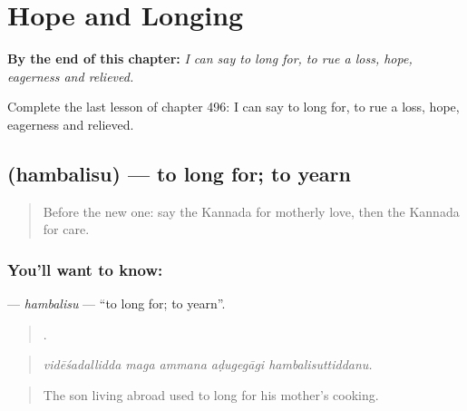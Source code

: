 
\chapter{Hope and Longing}
\label{ch:ka-hope-and-longing}

\begin{chapteropening}
\textbf{By the end of this chapter:} \emph{I can say to long for, to rue a loss, hope, eagerness and relieved.}

Complete the last lesson of chapter 496: I can say to long for, to rue a loss, hope, eagerness and relieved.
\end{chapteropening}

\section[\texorpdfstring{\kn{ಹಂಬಲಿಸು} (hambalisu)}{ಹಂಬಲಿಸು (hambalisu)}]{ (hambalisu) — to long for; to yearn}

\label{lesson:KA-C496-hambalisu}



\begin{quote}
Before the new one: say the Kannada for motherly love, then the Kannada for care.
\end{quote}

\subsection*{You'll want to know: }
\textbf{} — \emph{hambalisu} — \textquotedblleft{}to long for; to yearn\textquotedblright{}.

\begin{quote}
    .
\end{quote}

\begin{quote}
\emph{vidēśadallidda maga ammana aḍugegāgi hambalisuttiddanu.}
\end{quote}

\begin{quote}
The son living abroad used to long for his mother's cooking.
\end{quote}

